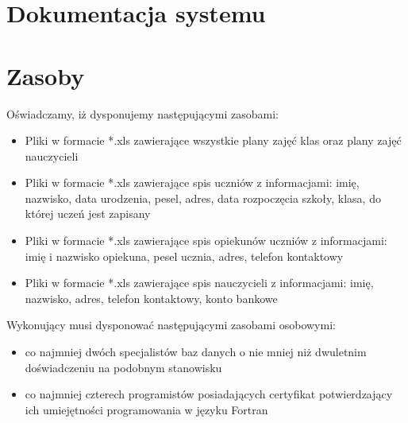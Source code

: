 \documentclass{article}
\begin{document}
\section{Dokumentacja systemu}
\section{Zasoby}
Oświadczamy, iż dysponujemy następującymi zasobami:
\begin{itemize}
    \item Pliki w formacie *.xls zawierające wszystkie plany zajęć klas oraz plany zajęć nauczycieli
    \item Pliki w formacie *.xls zawierające spis uczniów z informacjami: imię, nazwisko, data urodzenia, pesel, adres, data rozpoczęcia szkoły, klasa, do której uczeń jest zapisany
    \item Pliki w formacie *.xls zawierające spis opiekunów uczniów z informacjami: imię i nazwisko opiekuna, pesel ucznia, adres, telefon kontaktowy 
    \item Pliki w formacie *.xls zawierające spis nauczycieli z informacjami: imię, nazwisko, adres, telefon kontaktowy, konto bankowe %
\end{itemize}

Wykonujący musi dysponować następującymi zasobami osobowymi:
\begin{itemize}
    \item co najmniej dwóch specjalistów baz danych o nie mniej niż dwuletnim doświadczeniu na podobnym stanowisku
    \item co najmniej czterech programistów posiadających certyfikat potwierdzający ich umiejętności programowania w języku Fortran
\end{itemize}
\end{document}
